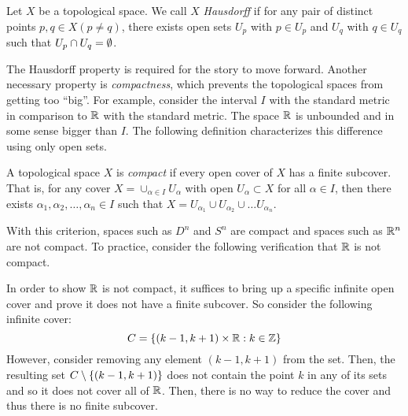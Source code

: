\documentclass[../sean_thesis.tex]{subfiles}
\begin{document}
\begin{definition}[Hausdorff]
	Let $X$ be a topological space. We call $X$ \emph{Hausdorff} if for any pair of distinct points $p,q \in X (p \neq q)$, there exists open sets $U_p$ with $p \in U_p$ and $U_q$ with $q \in U_q$ such that $U_p \cap U_q = \emptyset$.
\end{definition}

The Hausdorff property is required for the story to move forward. Another necessary property is \emph{compactness}, which prevents the topological spaces from getting too ``big''. For example, consider the interval $I$ with the standard metric in comparison to $\mathbb{R}$ with the standard metric. The space $\mathbb{R}$ is unbounded and in some sense bigger than $I$. The following definition characterizes this difference using only open sets.

\begin{definition}[Compact]
    A topological space $X$ is \emph{compact} if every open cover of $X$ has a finite subcover. That is, for any cover $X = \cup_{\alpha \in I} U_\alpha$ with open $U_\alpha \subset X$ for all $\alpha \in I$, then there exists $\alpha_1, \alpha_2, \dots, \alpha_n \in I$ such that $X = U_{\alpha_1} \cup U_{\alpha_2} \cup \dots U_{\alpha_n}$.
\end{definition}

With this criterion, spaces such as $D^n$ and $S^n$ are compact and spaces such as $\mathbb{R}^n$ are not compact. To practice, consider the following verification that $\mathbb{R}$ is not compact.
\begin{example}
	In order to show $\mathbb{R}$ is not compact, it suffices to bring up a specific infinite open cover and prove it does not have a finite subcover. So consider the following infinite cover:
	\begin{equation*}
		C = \left\{(k-1,k+1) \times \mathbb{R} : k \in \mathbb{Z}\right\}
	\end{equation*}
	However, consider removing any element $(k-1, k+1)$ from the set. Then, the resulting set $C \setminus \left\{(k-1,k+1)\right\}$ does not contain the point $k$ in any of its sets and so it does not cover all of $\mathbb{R}$. Then, there is no way to reduce the cover and thus there is no finite subcover.
\end{example}

\end{document}
